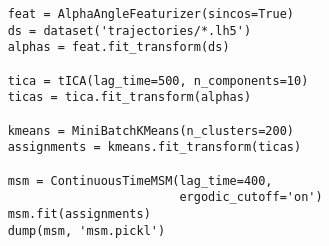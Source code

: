 \documentclass{article}
\begin{document}
\renewcommand{\theFancyVerbLine}{
  \sffamily\textcolor[rgb]{0.5,0.5,0.5}{\scriptsize\arabic{FancyVerbLine}}}


\begin{verbatim}
    feat = AlphaAngleFeaturizer(sincos=True)
    ds = dataset('trajectories/*.lh5')
    alphas = feat.fit_transform(ds)

    tica = tICA(lag_time=500, n_components=10)
    ticas = tica.fit_transform(alphas)

    kmeans = MiniBatchKMeans(n_clusters=200)
    assignments = kmeans.fit_transform(ticas)

    msm = ContinuousTimeMSM(lag_time=400,
                            ergodic_cutoff='on')
    msm.fit(assignments)
    dump(msm, 'msm.pickl')
\end{verbatim}
\end{document}
